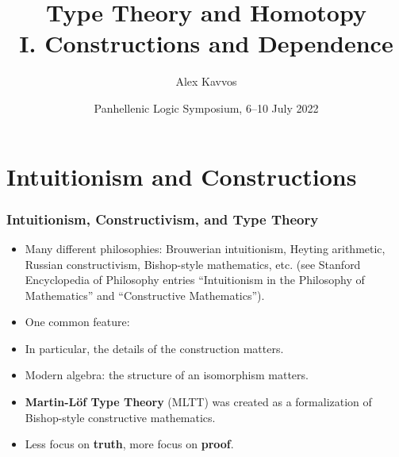\documentclass[handout]{beamer} %
\title{Type Theory and Homotopy \\ I. Constructions and Dependence}
\author{
		Alex Kavvos %
}
\institute{
    University of Bristol
}
\date{Panhellenic Logic Symposium, 6--10 July 2022}
\begin{document}
\frame{\titlepage}


\section{Intuitionism and Constructions}

\begin{frame}
  \frametitle{Intuitionism, Constructivism, and Type Theory}
  
  \begin{itemize}
    \item Many different philosophies: Brouwerian intuitionism, Heyting
      arithmetic, Russian constructivism, Bishop-style mathematics, etc. (see
      Stanford Encyclopedia of Philosophy entries ``Intuitionism in the
      Philosophy of Mathematics'' and ``Constructive Mathematics'').    

    \item One common feature:
      \begin{center}
      \end{center}
      
    \item In particular, the details of the construction matters.
      
    \item Modern algebra: the structure of an isomorphism matters.

    \item \textbf{Martin-L\"of Type Theory} (MLTT) was created as a
      formalization of Bishop-style constructive mathematics.
      
    \item Less focus on \textbf{truth}, more focus on \textbf{proof}.

  \end{itemize}

  
\end{frame}
\end{document}
